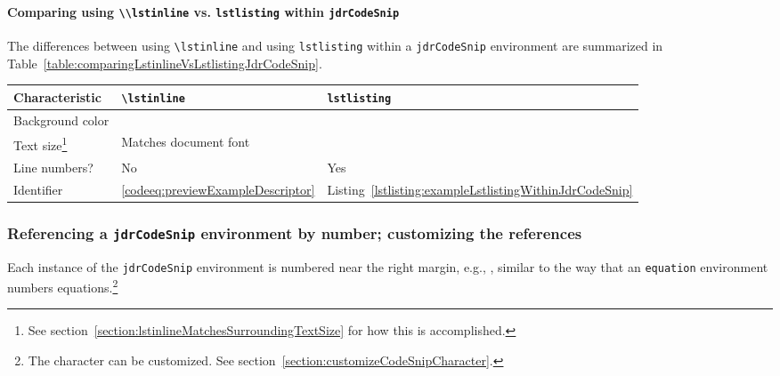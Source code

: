 \documentclass[12pt,table,final]{article}%
\begin{document}
\paragraph{Comparing using \lstinline|\\lstinline| vs. \lstinline|lstlisting| within \lstinline|jdrCodeSnip|}
\label{section:comparingLstinlineVsLstlistingJdrCodeSnip}
The differences between using \lstinline|\lstinline| and using \lstinline|lstlisting| within a \lstinline|jdrCodeSnip| environment are summarized in Table~\ref{table:comparingLstinlineVsLstlistingJdrCodeSnip}.


\begin{jdrtable}[!htb] %
\centering
\caption{Comparing using \lstinline|\\lstinline| vs. \lstinline|lstlisting| within \lstinline|jdrCodeSnip|}
\label{table:comparingLstinlineVsLstlistingJdrCodeSnip}
\begin{tabular}[t]{L{4.0cm}L{5.0cm}L{5.0cm}}
Characteristic      &   \lstinline|\lstinline|  &   \lstinline|lstlisting|\\
\midrule
Background color    &                 &    \\
Text size\footnote{See section~\ref{section:lstinlineMatchesSurroundingTextSize} for how this is accomplished.}           &   Matches document font   &   {\lstFontSizeDisplay{\lstinline|\lstFontSizeDisplay|}}   \\
Line numbers?       &   No                      &   Yes \\
Identifier          &   \ref{codeeq:previewExampleDescriptor}  &   Listing~\ref{lstlisting:exampleLstlistingWithinJdrCodeSnip} \\
\end{tabular}
\end{jdrtable}%

\FloatBarrier

\subsubsection{Referencing a \lstinline|jdrCodeSnip| environment by number; customizing the references}
\label{section:referencingJdrCodeSnipByNumber}
Each instance of the \lstinline|jdrCodeSnip| environment is numbered near the right margin, e.g., \CodeSnipCharacterJdrLst, similar to the way that an \lstinline|equation| environment numbers equations.\footnote{The \CodeSnipCharacterJdrLst{} character can be customized. See section~\ref{section:customizeCodeSnipCharacter}.}
\end{document}
